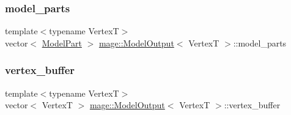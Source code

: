 \hypertarget{structmage_1_1_model_output_ac101de6237d4de379f7f85bbdf71dc46}{}\label{structmage_1_1_model_output_ac101de6237d4de379f7f85bbdf71dc46} 
\subsubsection{\texorpdfstring{model\+\_\+parts}{model\_parts}}
{\footnotesize\ttfamily template$<$typename VertexT$>$ \\
vector$<$ \hyperlink{structmage_1_1_model_part}{Model\+Part} $>$ \hyperlink{structmage_1_1_model_output}{mage\+::\+Model\+Output}$<$ VertexT $>$\+::model\+\_\+parts}

\hypertarget{structmage_1_1_model_output_a8180bf5262d435a394936d50f056c4a3}{}\label{structmage_1_1_model_output_a8180bf5262d435a394936d50f056c4a3} 
\subsubsection{\texorpdfstring{vertex\+\_\+buffer}{vertex\_buffer}}
{\footnotesize\ttfamily template$<$typename VertexT$>$ \\
vector$<$ VertexT $>$ \hyperlink{structmage_1_1_model_output}{mage\+::\+Model\+Output}$<$ VertexT $>$\+::vertex\+\_\+buffer}

